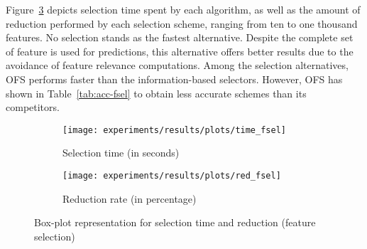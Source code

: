 \documentclass[preprint,12pt]{elsarticle}
\begin{document}
\begin{table}[!htp]
\renewcommand{\arraystretch}{1.3}
\centering
\scriptsize
\caption{Wilcoxon test results and average rankings of methods (Friedman Procedure \& Adjusted p-value with Holm's Test) for accuracy}
\label{tab:friedman-fsel}
\end{table}


Figure~\ref{fig:fsel} depicts selection time spent by each algorithm, as well as the amount of reduction performed by each selection scheme, ranging from ten to one thousand features.
No selection stands as the fastest alternative. Despite the complete set of feature is used for predictions, this alternative offers better results due to the avoidance of feature relevance computations. Among the selection alternatives, OFS performs faster than the information-based selectors. However, OFS has shown in Table~\ref{tab:acc-fsel} to obtain less accurate schemes than its competitors. 

\begin{figure}
\begin{subfigure}{.5\textwidth}
  \centering
  \texttt{[image: experiments/results/plots/time\_fsel]}
  \caption{Selection time (in seconds)}
  \label{fig:time-fsel}
\end{subfigure}%
\begin{subfigure}{.5\textwidth}
  \centering
  \texttt{[image: experiments/results/plots/red\_fsel]}
  \caption{Reduction rate (in percentage)}
  \label{fig:red-fsel}
\end{subfigure}
\caption{Box-plot representation for selection time and reduction (feature selection)}
\label{fig:fsel}
\end{figure}
\end{document}
